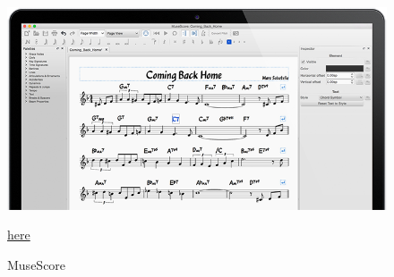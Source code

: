 		\begin{figure}[H]
			\centering
			\includegraphics[width=0.8\linewidth]{figure/Analysis/musescore.png}
			\label{fig:MuseScore}
			\caption{MuseScore}
			\href{https://musescore.org/da}{\color{blue}here}
		\end{figure}
	
	
	
	
	
	
	
	
















		